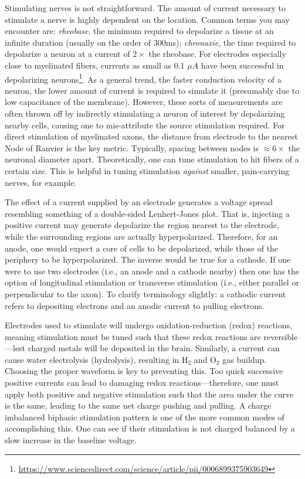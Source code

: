 Stimulating nerves is not straightforward. The amount of current necessary to stimulate a nerve is highly dependent on the location. Common terms you may encounter are: \textit{rheobase}, the minimum required to depolarize a tissue at an infinite duration (usually on the order of 300ms);  \textit{chronaxie}, the time required to depolarize a neuron at a current of $2\times$ the rheobase. For electrodes especially close to myelinated fibers, currents as small as 0.1 $\mu A$ have been successful in depolarizing neurons\footnote{\url{https://www.sciencedirect.com/science/article/pii/0006899375903649}}. As a general trend, the faster conduction velocity of a neuron, the lower amount of current is required to simulate it (presumably due to low capacitance of the membrane). However, these sorts of measurements are often thrown off by indirectly stimulating a neuron of interest by depolarizing nearby cells, causing one to mis-attribute the source stimulation required. For direct stimulation of myelinated axons, the distance from electrode to the nearest Node of Ranvier is the key metric. Typically, spacing between nodes is $\approx 6 \times $ the neuronal diameter apart. Theoretically, one can tune stimulation to hit fibers of a certain size. This is helpful in tuning stimulation \textit{against} smaller, pain-carrying nerves, for example. \newline

The effect of a current supplied by an electrode generates a voltage spread resembling something of a double-sided Lenhert-Jones plot. That is, injecting a positive current may generate depolarize the region nearest to the electrode, while the surrounding regions are actually hyperpolarized. Therefore, for an anode, one would  expect a core of cells to be depolarized, while those of the periphery to be hyperpolarized. The inverse would be true for a cathode. If one were to use two electrodes (i.e., an anode and a cathode nearby) then one has the option of longitudinal stimulation or transverse stimulation (i.e., either parallel or perpendicular to the axon). To clarify terminology slightly: a cathodic current refers to depositing electrons and an anodic current to pulling electrons. \newline

Electrodes used to stimulate will undergo oxidation-reduction (redox) reactions, meaning stimulation must be tuned such that these redox reactions are reversible---lest charged metals will be deposited in the brain. Similarly, a current can cause water electrolysis (hydrolysis), resulting in H$_2$ and O$_2$ gas buildup. Choosing the proper waveform is key to preventing this. Too quick successive positive currents can lead to damaging redox reactions---therefore, one must apply both positive and negative stimulation such that the area under the curve is the same, leading to the same net charge pushing and pulling. A charge imbalanced biphasic stimulation pattern is one of the more common modes of accomplishing this. One can see if their stimulation is not charged balanced by a slow increase in the baseline voltage.\newline

